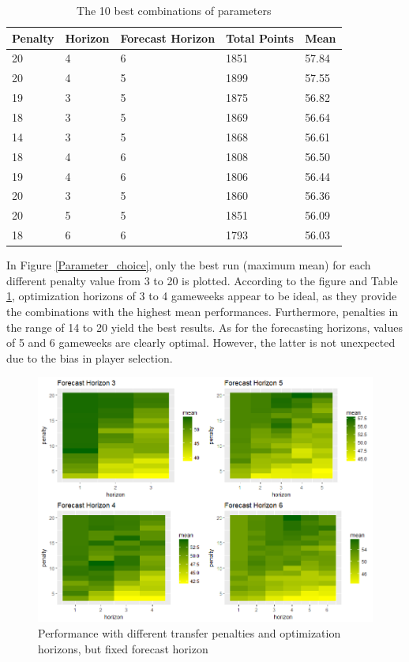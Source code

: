 \begin{table}[H]
\centering
\caption{The 10 best combinations of parameters}
\label{tab:top_10}
\begin{tabular}{|l|l|l|l|l|}
\hline
Penalty & Horizon & Forecast Horizon & Total Points & Mean  \\
\hline
20      & 4       & 6                & 1851         & 57.84 \\
20      & 4       & 5                & 1899         & 57.55 \\
19      & 3       & 5                & 1875         & 56.82 \\
18      & 3       & 5                & 1869         & 56.64 \\
14      & 3       & 5                & 1868         & 56.61 \\
18      & 4       & 6                & 1808         & 56.50 \\
19      & 4       & 6                & 1806         & 56.44 \\
20      & 3       & 5                & 1860         & 56.36 \\
20      & 5       & 5                & 1851         & 56.09 \\
18      & 6       & 6                & 1793         & 56.03 \\
\hline
\end{tabular}
\end{table}


In Figure \ref{Parameter_choice}, only the best run (maximum mean) for each different penalty value from 3 to 20 is plotted. According to the figure and Table \ref{tab:top_10}, optimization horizons of 3 to 4 gameweeks appear to be ideal, as they provide the combinations with the highest mean performances. Furthermore, penalties in the range of 14 to 20 yield the best results. As for the forecasting horizons, values of 5 and 6 gameweeks are clearly optimal. However, the latter is not unexpected due to the bias in player selection. 

\begin{figure}[H]
    \centering
    \includegraphics[scale=0.55]{fig/chapter_6/parameter_choice_fixed_f_hor.png}
    \caption{Performance with different transfer penalties and optimization horizons, but fixed forecast horizon}
\label{fig:fixed_f_hor}    
\end{figure}

